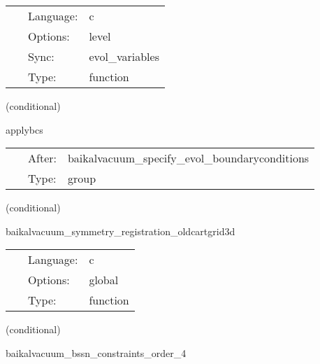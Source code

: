 \hspace{5mm}

 \begin{tabular*}{160mm}{cll} 
~ & Language:  & c \\ 
~ & Options:  & level \\ 
~ & Sync:  & evol\_variables \\ 
~ & Type:  & function \\ 
\end{tabular*} 


\vspace{5mm}

   (conditional) 

\hspace{5mm} applybcs 

\hspace{5mm}{\it apply registered boundary conditions } 


\hspace{5mm}

 \begin{tabular*}{160mm}{cll} 
~ & After:  & baikalvacuum\_specify\_evol\_boundaryconditions \\ 
~ & Type:  & group \\ 
\end{tabular*} 


\vspace{5mm}

   (conditional) 

\hspace{5mm} baikalvacuum\_symmetry\_registration\_oldcartgrid3d 

\hspace{5mm}{\it register symmetries, the cartgrid3d way. } 


\hspace{5mm}

 \begin{tabular*}{160mm}{cll} 
~ & Language:  & c \\ 
~ & Options:  & global \\ 
~ & Type:  & function \\ 
\end{tabular*} 


\vspace{5mm}

   (conditional) 

\hspace{5mm} baikalvacuum\_bssn\_constraints\_order\_4 

